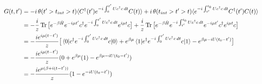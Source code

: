 \documentclass{article}
\begin{document}
\begin{align*}
G(t,t') &= -i\operatorname{\theta}(t' > t_{int} > t) \langle C^\dagger(t') e^{-i\int_0^{t'} U c^\dagger c\, dt} C(t) \rangle + i\operatorname{\theta}(t_{int} > t' > t)   \langle e^{-i\int_{t'}^{t_0} U c^\dagger c\, dt} C^\dagger(t') C(t) \rangle \\
&= -\frac{i}{z} \operatorname{Tr} \big[e^{-\beta\hat{H}} e^{-i\mu t'} c^\dagger e^{-i\int_0^{t'} U c^\dagger c \, dt} e^{i\mu t} c \big] + \frac{i}{z} \operatorname{Tr} \big[ e^{-\beta\hat{H}} e^{-i\int_{t'}^{t_0} U c^\dagger c\, dt} e^{-i\mu t'} c^\dagger e^{i\mu t} c \big] \\
&= -\frac{i e^{i\mu(t-t')}}{z}\big[\braket{0|c^\dagger e^{-i\int_{0}^{t'} U c^\dagger c\,dt} c |0} + e^{\beta\mu} \braket{1| e^\dagger e^{-i\int_0^{t'} Uc^\dagger c\, dt} c | 1} - e^{\beta\mu - iU(t_0-t')}\big] \\
&= -\frac{ie^{i\mu(t-t')}}{z}(0+ e^{\beta\mu}(1) - e^{\beta\mu - iU(t_0 - t')}) \\
&= -\frac{ie^{\mu(\beta + i(t-t'))}}{z}(1- e^{-iU(t_0-t')}) 
\end{align*}
\end{document}
